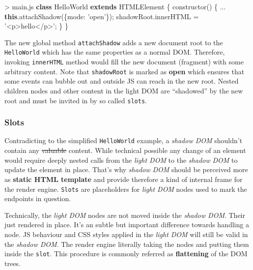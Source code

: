 \documentclass[]{assets/latex/ieee}
\newenvironment{Shaded}{}{}
\newcommand{\KeywordTok}[1]{\textcolor[rgb]{0.00,0.44,0.13}{\textbf{{#1}}}}
\newcommand{\DataTypeTok}[1]{\textcolor[rgb]{0.56,0.13,0.00}{{#1}}}
\newcommand{\StringTok}[1]{\textcolor[rgb]{0.25,0.44,0.63}{{#1}}}
\newcommand{\VariableTok}[1]{\textcolor[rgb]{0.10,0.09,0.49}{{#1}}}
\newcommand{\OperatorTok}[1]{\textcolor[rgb]{0.40,0.40,0.40}{{#1}}}
\newcommand{\AttributeTok}[1]{\textcolor[rgb]{0.49,0.56,0.16}{{#1}}}
\newcommand{\NormalTok}[1]{{#1}}
\begin{document}
\begin{Shaded}
\begin{Highlighting}[]
\OperatorTok{>} \VariableTok{main}\NormalTok{.}\AttributeTok{js}
\KeywordTok{class} \NormalTok{HelloWorld }\KeywordTok{extends} \NormalTok{HTMLElement }\OperatorTok{\{}
 \AttributeTok{constructor}\NormalTok{() }\OperatorTok{\{}
  \NormalTok{...}
  \KeywordTok{this}\NormalTok{.}\AttributeTok{attachShadow}\NormalTok{(}\OperatorTok{\{}\DataTypeTok{mode}\OperatorTok{:} \StringTok{'open'}\OperatorTok{\}}\NormalTok{)}\OperatorTok{;}
  \VariableTok{shadowRoot}\NormalTok{.}\AttributeTok{innerHTML} \OperatorTok{=} \StringTok{'<p>hello</p>'}\OperatorTok{;}
 \OperatorTok{\}}
\OperatorTok{\}}
\end{Highlighting}
\end{Shaded}

The new global method \texttt{attachShadow} adds a new document root to
the \texttt{HelloWorld} which has the same properties as a normal DOM.
Therefore, invoking \texttt{innerHTML} method would fill the new
document (fragment) with some arbitrary content. Note that
\texttt{shadowRoot} is marked as \textbf{open} which ensures that some
events can bubble out and outside JS can reach in the new root. Nested
children nodes and other content in the light DOM are ``shadowed'' by
the new root and must be invited in by so called \texttt{slots}.

\subsubsection{Slots}\label{slots}

Contradicting to the simplified \texttt{HelloWorld} example, a
\emph{shadow DOM} shouldn't contain any \sout{valuable} content. While
technical possible any change of an element would require deeply nested
calls from the \emph{light DOM} to the \emph{shadow DOM} to update the
element in place. That's why \emph{shadow DOM} should be perceived more
as \textbf{static HTML template} and provide therefore a kind of
internal frame for the render engine. \texttt{Slots} are placeholders
for \emph{light DOM} nodes used to mark the endpoints in question.

Technically, the \emph{light DOM} nodes are not moved inside the
\emph{shadow DOM}. Their just rendered in place. It's an subtle but
important difference towards handling a node. JS behaviour and CSS
styles applied in the \emph{light DOM} will still be valid in the
\emph{shadow DOM}. The render engine literally taking the nodes and
putting them inside the \texttt{slot}. This procedure is commonly
referred as \textbf{flattening} of the DOM trees.
\end{document}
